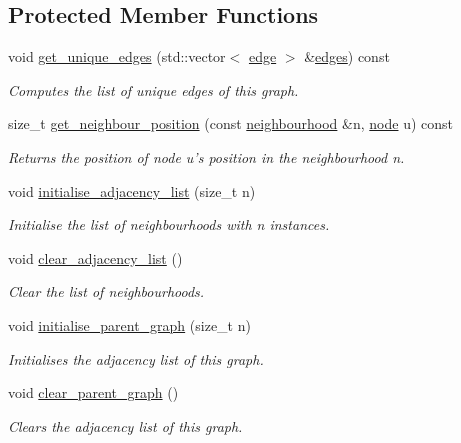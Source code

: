 \subsection*{Protected Member Functions}
\begin{DoxyCompactItemize}
\item 
void \hyperlink{classlgraph_1_1udgraph_a0d03598ba03395ac02c2fc3fc3e9499a}{get\-\_\-unique\-\_\-edges} (std\-::vector$<$ \hyperlink{namespacelgraph_a76bd7d50719f03de7a85db259d80d572}{edge} $>$ \&\hyperlink{classlgraph_1_1uxgraph_af6a643eaca31fa945b428567ab0fa66d}{edges}) const 
\begin{DoxyCompactList}\small\item\em Computes the list of unique edges of this graph. \end{DoxyCompactList}\item 
size\-\_\-t \hyperlink{classlgraph_1_1xxgraph_a8c176b1d19cf8d0b299c419e325df21d}{get\-\_\-neighbour\-\_\-position} (const \hyperlink{namespacelgraph_a052e7766c13f3a43cec0aec8173fdede}{neighbourhood} \&n, \hyperlink{namespacelgraph_a397169dd66adf725210a30fb7251773e}{node} u) const 
\begin{DoxyCompactList}\small\item\em Returns the position of node {\itshape u's} position in the neighbourhood {\itshape n}. \end{DoxyCompactList}\item 
\hypertarget{classlgraph_1_1xxgraph_a682d586f850add8b7e637aeea81b0292}{void \hyperlink{classlgraph_1_1xxgraph_a682d586f850add8b7e637aeea81b0292}{initialise\-\_\-adjacency\-\_\-list} (size\-\_\-t n)}\label{classlgraph_1_1xxgraph_a682d586f850add8b7e637aeea81b0292}

\begin{DoxyCompactList}\small\item\em Initialise the list of neighbourhoods with {\itshape n} instances. \end{DoxyCompactList}\item 
\hypertarget{classlgraph_1_1xxgraph_a6b15c62c68919722f7eb18fe273d45fe}{void \hyperlink{classlgraph_1_1xxgraph_a6b15c62c68919722f7eb18fe273d45fe}{clear\-\_\-adjacency\-\_\-list} ()}\label{classlgraph_1_1xxgraph_a6b15c62c68919722f7eb18fe273d45fe}

\begin{DoxyCompactList}\small\item\em Clear the list of neighbourhoods. \end{DoxyCompactList}\item 
void \hyperlink{classlgraph_1_1xxgraph_a50c658dd39e6b1d38bf7e514daa2f33c}{initialise\-\_\-parent\-\_\-graph} (size\-\_\-t n)
\begin{DoxyCompactList}\small\item\em Initialises the adjacency list of this graph. \end{DoxyCompactList}\item 
void \hyperlink{classlgraph_1_1xxgraph_a4122495066e4402cbf6d2d9bb82d54cc}{clear\-\_\-parent\-\_\-graph} ()
\begin{DoxyCompactList}\small\item\em Clears the adjacency list of this graph. \end{DoxyCompactList}\end{DoxyCompactItemize}
